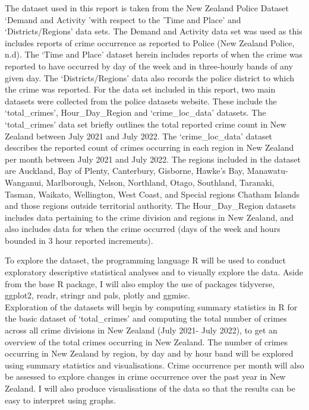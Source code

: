 \documentclass[
  10pt,
]{article}
\begin{document}
The dataset used in this report is taken from the New Zealand Police
Dataset `Demand and Activity 'with respect to the 'Time and Place' and
`Districts/Regions' data sets. The Demand and Activity data set was used
as this includes reports of crime occurrence as reported to Police (New
Zealand Police, n.d). The `Time and Place' dataset herein includes
reports of when the crime was reported to have occurred by day of the
week and in three-hourly bands of any given day. The `Districts/Regions'
data also records the police district to which the crime was reported.
For the data set included in this report, two main datasets were
collected from the police datasets website. These include the
`total\_crimes', Hour\_Day\_Region and `crime\_loc\_data' datasets. The
`total\_crimes' data set briefly outlines the total reported crime count
in New Zealand between July 2021 and July 2022. The `crime\_loc\_data'
dataset describes the reported count of crimes occurring in each region
in New Zealand per month between July 2021 and July 2022. The regions
included in the dataset are Auckland, Bay of Plenty, Canterbury,
Gisborne, Hawke's Bay, Manawatu-Wanganui, Marlborough, Nelson,
Northland, Otago, Southland, Taranaki, Tasman, Waikato, Wellington, West
Coast, and Special regions Chatham Islands and those regions outside
territorial authority. The Hour\_Day\_Region datasets includes data
pertaining to the crime division and regions in New Zealand, and also
includes data for when the crime occurred (days of the week and hours
bounded in 3 hour reported increments).

To explore the dataset, the programming language R will be used to
conduct exploratory descriptive statistical analyses and to visually
explore the data. Aside from the base R package, I will also employ the
use of packages tidyverse, ggplot2, readr, stringr and pals, plotly and
ggmisc.\\
Exploration of the datasets will begin by computing summary statistics
in R for the basic dataset of `total\_crimes' and computing the total
number of crimes across all crime divisions in New Zealand (July 2021-
July 2022), to get an overview of the total crimes occurring in New
Zealand. The number of crimes occurring in New Zealand by region, by day
and by hour band will be explored using summary statistics and
visualisations. Crime occurrence per month will also be assessed to
explore changes in crime occurrence over the past year in New Zealand. I
will also produce visualisations of the data so that the results can be
easy to interpret using graphs.
\end{document}
